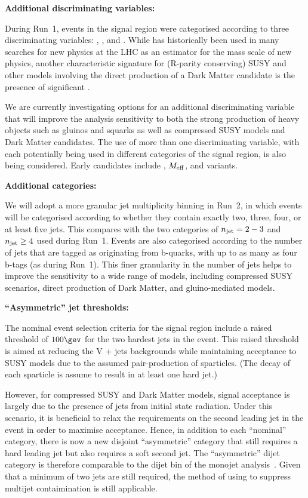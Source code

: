 {\bf Additional discriminating variables:}

During Run~1, events in the signal region were categorised according
to three discriminating variables: \scalht, \njet, and \nb. While
\scalht has historically been used in many searches for new physics at
the LHC as an estimator for the mass scale of new physics, another
characteristic signature for (R-parity conserving) SUSY and other
models involving the direct production of a Dark Matter candidate is
the presence of significant \met.

We are currently investigating options for an additional
discriminating variable that will improve the analysis sensitivity to
both the strong production of heavy objects such as gluinos and
squarks as well as compressed SUSY models and Dark Matter
candidates. The use of more than one discriminating variable, with
each potentially being used in different categories of the signal
region, is also being considered. Early candidates include \mht,
$M_{\rm eff}$, and variants.

{\bf Additional \njet categories:}

We will adopt a more granular jet multiplicity binning in Run~2, in
which events will be categorised according to whether they contain
exactly two, three, four, or at least five jets. This compares with
the two categories of $n_{\text{jet}} = 2-3$ and $n_{\text{jet}} \geq 4$ used during
Run~1. Events are also categorised according to the number of jets
that are tagged as originating from b-quarks, with up to as many as
four b-tags (as during Run~1). This finer granularity in the number of
jets helps to improve the sensitivity to a wide range of models,
including compressed SUSY scenarios, direct production of Dark Matter,
and gluino-mediated models.

{\bf ``Asymmetric'' jet \Pt thresholds:}

The nominal event selection criteria for the signal region include a
raised threshold of $100\gev$ for the two hardest jets in the
event. This raised threshold is aimed at reducing the V + jets
backgrounds while maintaining acceptance to SUSY models due to the
assumed pair-production of sparticles. (The decay of each
sparticle is assume to result in at least one hard jet.) 

However, for compressed SUSY and Dark Matter models, signal acceptance
is largely due to the presence of jets from initial state
radiation. Under this scenario, it is beneficial to relax the
requirements on the second leading jet in the event in order to
maximise acceptance. Hence, in addition to each ``nominal'' \njet
category, there is now a new disjoint ``asymmetric'' \njet category
that still requires a hard leading jet but also requires a soft second
jet. The ``asymmetric'' dijet category is therefore comparable to the
dijet bin of the monojet analysis~\cite{}. Given that a minimum of two
jets are still required, the method of using \alphat to suppress
multijet contaimination is still applicable. 

